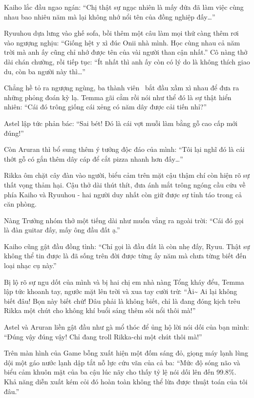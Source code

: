 \documentclass[../main.tex]{subfiles}
\begin{document}
Kaiho lắc đầu ngao ngán: ``Chị thật sự ngạc nhiên là mấy đứa đã làm việc cùng nhau bao nhiêu năm mà lại không nhớ nổi tên của đồng nghiệp đấy\dots''

Ryuuhou dựa lưng vào ghế sofa, bồi thêm một câu làm mọi thứ càng thêm rơi vào ngượng nghịu: ``Giống hệt y xì đúc Onii nhà mình. Học cùng nhau cả năm trời mà anh ấy cũng chỉ nhớ được tên của vài người than cận nhất.'' Cô nàng thở dài chán chường, rồi tiếp tục: ``Ít nhất thì anh ấy còn có lý do là không thích giao du, còn ba người này thì\dots''

Chẳng hề tỏ ra ngượng ngùng, ba thành viên \hls\ bắt đầu xầm xì nhau để đưa ra những phỏng đoán kỳ lạ. Temma gãi cằm rồi nói như thể đó là sự thật hiển nhiên: ``Cái đó trông giống cái xẻng có năm dây được cải tiến nhỉ?''

Astel lập tức phản bác: ``Sai bét! Đó là cái vợt muỗi làm bằng gỗ cao cấp mới đúng!''

Còn Aruran thì bổ sung thêm ý tưởng độc đáo của mình: ``Tôi lại nghĩ đó là cái thớt gỗ có gắn thêm dây cáp để cắt pizza nhanh hơn đấy\dots''

Rikka ôm chặt cây đàn vào người, biểu cảm trên mặt cậu thậm chí còn hiện rõ sự thất vọng thảm hại. Cậu thở dài thút thít, đưa ánh mắt trông ngóng cầu cứu về phía Kaiho và Ryuuhou - hai người duy nhất còn giữ được sự tỉnh táo trong cả căn phòng.

Nàng Trưởng nhóm thở một tiếng dài như muốn vẳng ra ngoài trời: ``Cái đó gọi là đàn guitar đấy, mấy ông đầu đất ạ.''

Kaiho cũng gật đầu đồng tình: ``Chỉ gọi là đầu đất là còn nhẹ đấy, Ryuu. Thật sự không thể tin được là đã sống trên đời được từng ấy năm mà chưa từng biết đến loại nhạc cụ này.''

Bị lộ rõ sự ngu dốt của mình và bị hai chị em nhà nàng Tổng kháy đểu, Temma lập tức khoanh tay, ngước mặt lên trời và xua tay cười trừ: ``Ài\~{} Ai lại không biết đâu! Bọn này biết chứ! Đâu phải là không biết, chỉ là đang đóng kịch trêu Rikka một chút cho không khí buổi sáng thêm sôi nổi thôi mà!''

Astel và Aruran liền gật đầu như gà mổ thóc để ủng hộ lời nói dối của bạn mình: ``Đúng vậy đúng vậy! Chỉ đang troll Rikka-chi một chút thôi mà!''

Trên màn hình của Game bỗng xuất hiện một đốm sáng đỏ, giọng máy lạnh lùng dội một gáo nước lạnh dập tắt nỗ lực cứu vãn của cả ba: ``Mức độ sóng não và biểu cảm khuôn mặt của ba cậu lúc nãy cho thấy tỷ lệ nói dối lên đến 99.8\%. Khả năng diễn xuất kém cỏi đó hoàn toàn không thể lừa được thuật toán của tôi đâu.''
\end{document}

